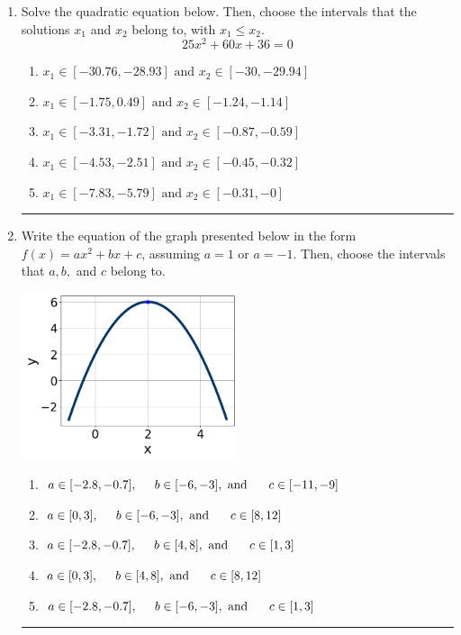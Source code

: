 \documentclass[14pt]{extbook}
\newcommand{\litem}[1]{\item#1\hspace*{-1cm}\rule{\textwidth}{0.4pt}}
\begin{document}
\begin{enumerate}
{\begin{enumerate}[label=\Alph*.]
\end{enumerate} }
\litem{
Solve the quadratic equation below. Then, choose the intervals that the solutions $x_1$ and $x_2$ belong to, with $x_1 \leq x_2$.\[ 25x^{2} +60 x + 36 = 0 \]\begin{enumerate}[label=\Alph*.]
\item \( x_1 \in [-30.76, -28.93] \text{ and } x_2 \in [-30, -29.94] \)
\item \( x_1 \in [-1.75, 0.49] \text{ and } x_2 \in [-1.24, -1.14] \)
\item \( x_1 \in [-3.31, -1.72] \text{ and } x_2 \in [-0.87, -0.59] \)
\item \( x_1 \in [-4.53, -2.51] \text{ and } x_2 \in [-0.45, -0.32] \)
\item \( x_1 \in [-7.83, -5.79] \text{ and } x_2 \in [-0.31, -0] \)

\end{enumerate} }
\litem{
Write the equation of the graph presented below in the form $f(x)=ax^2+bx+c$, assuming  $a=1$ or $a=-1$. Then, choose the intervals that $a, b,$ and $c$ belong to.
\begin{center}
    \includegraphics[width=0.5\textwidth]{../Figures/quadraticGraphToEquationCopyB.png}
\end{center}
\begin{enumerate}[label=\Alph*.]
\item \( a \in [-2.8, -0.7], \hspace*{5mm} b \in [-6, -3], \text{ and } \hspace*{5mm} c \in [-11, -9] \)
\item \( a \in [0, 3], \hspace*{5mm} b \in [-6, -3], \text{ and } \hspace*{5mm} c \in [8, 12] \)
\item \( a \in [-2.8, -0.7], \hspace*{5mm} b \in [4, 8], \text{ and } \hspace*{5mm} c \in [1, 3] \)
\item \( a \in [0, 3], \hspace*{5mm} b \in [4, 8], \text{ and } \hspace*{5mm} c \in [8, 12] \)
\item \( a \in [-2.8, -0.7], \hspace*{5mm} b \in [-6, -3], \text{ and } \hspace*{5mm} c \in [1, 3] \)


\end{enumerate}}
\end{enumerate}
\end{document}
